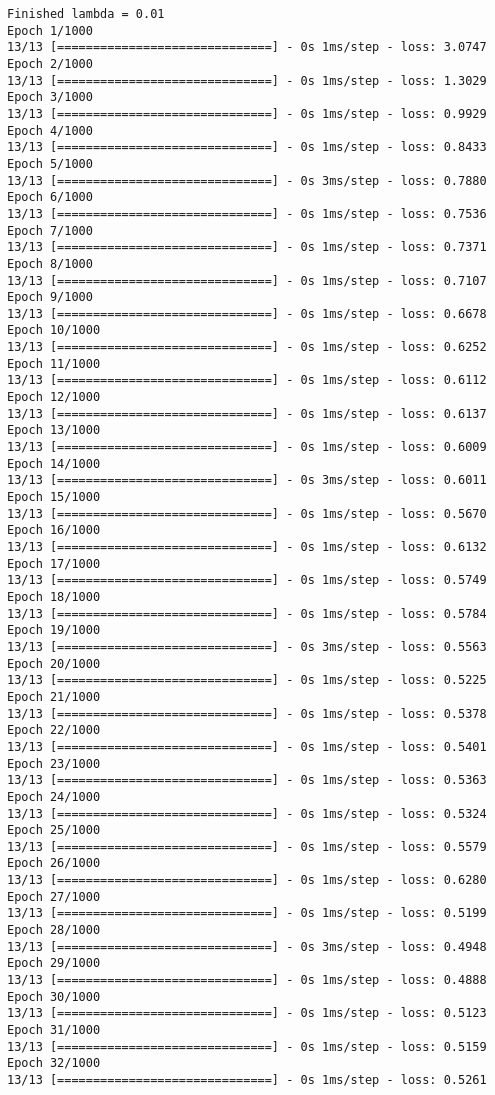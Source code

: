 \documentclass[11pt]{article}
\begin{document}
\begin{Verbatim}[commandchars=\\\{\}]
Finished lambda = 0.01
Epoch 1/1000
13/13 [==============================] - 0s 1ms/step - loss: 3.0747
Epoch 2/1000
13/13 [==============================] - 0s 1ms/step - loss: 1.3029
Epoch 3/1000
13/13 [==============================] - 0s 1ms/step - loss: 0.9929
Epoch 4/1000
13/13 [==============================] - 0s 1ms/step - loss: 0.8433
Epoch 5/1000
13/13 [==============================] - 0s 3ms/step - loss: 0.7880
Epoch 6/1000
13/13 [==============================] - 0s 1ms/step - loss: 0.7536
Epoch 7/1000
13/13 [==============================] - 0s 1ms/step - loss: 0.7371
Epoch 8/1000
13/13 [==============================] - 0s 1ms/step - loss: 0.7107
Epoch 9/1000
13/13 [==============================] - 0s 1ms/step - loss: 0.6678
Epoch 10/1000
13/13 [==============================] - 0s 1ms/step - loss: 0.6252
Epoch 11/1000
13/13 [==============================] - 0s 1ms/step - loss: 0.6112
Epoch 12/1000
13/13 [==============================] - 0s 1ms/step - loss: 0.6137
Epoch 13/1000
13/13 [==============================] - 0s 1ms/step - loss: 0.6009
Epoch 14/1000
13/13 [==============================] - 0s 3ms/step - loss: 0.6011
Epoch 15/1000
13/13 [==============================] - 0s 1ms/step - loss: 0.5670
Epoch 16/1000
13/13 [==============================] - 0s 1ms/step - loss: 0.6132
Epoch 17/1000
13/13 [==============================] - 0s 1ms/step - loss: 0.5749
Epoch 18/1000
13/13 [==============================] - 0s 1ms/step - loss: 0.5784
Epoch 19/1000
13/13 [==============================] - 0s 3ms/step - loss: 0.5563
Epoch 20/1000
13/13 [==============================] - 0s 1ms/step - loss: 0.5225
Epoch 21/1000
13/13 [==============================] - 0s 1ms/step - loss: 0.5378
Epoch 22/1000
13/13 [==============================] - 0s 1ms/step - loss: 0.5401
Epoch 23/1000
13/13 [==============================] - 0s 1ms/step - loss: 0.5363
Epoch 24/1000
13/13 [==============================] - 0s 1ms/step - loss: 0.5324
Epoch 25/1000
13/13 [==============================] - 0s 1ms/step - loss: 0.5579
Epoch 26/1000
13/13 [==============================] - 0s 1ms/step - loss: 0.6280
Epoch 27/1000
13/13 [==============================] - 0s 1ms/step - loss: 0.5199
Epoch 28/1000
13/13 [==============================] - 0s 3ms/step - loss: 0.4948
Epoch 29/1000
13/13 [==============================] - 0s 1ms/step - loss: 0.4888
Epoch 30/1000
13/13 [==============================] - 0s 1ms/step - loss: 0.5123
Epoch 31/1000
13/13 [==============================] - 0s 1ms/step - loss: 0.5159
Epoch 32/1000
13/13 [==============================] - 0s 1ms/step - loss: 0.5261

\end{Verbatim}
\end{document}
